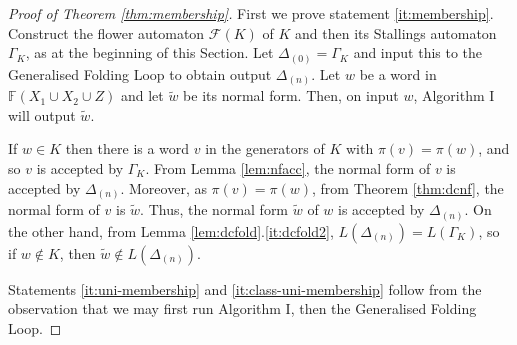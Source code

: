 \documentclass[a4paper,12pt]{article}
\newcommand{\G}{\Gamma }
\newcommand{\D}{\Delta }
\renewcommand{\L}{\Lambda }
\renewcommand{\S}{\Sigma }
\newcommand{\cA}{{\cal{A}}}
\newcommand{\cF}{{\cal{F}}}
\newtheorem{theorem}{Theorem}[section]
\numberwithin{equation}{section}
\numberwithin{figure}{section}
\newcommand{\FF}{\ensuremath{\mathbb{F}}}
\renewcommand{\cF}{\mathcal{F}}
\begin{document}

\begin{proof}[Proof of Theorem \ref{thm:membership}]
First we prove statement \ref{it:membership}.
Construct the flower automaton $\cF(K)$ of $K$ and then
its Stallings automaton $\G_K$,  as at the beginning of this Section. %
Let $\D_{(0)}=\G_K$ and input this to the Generalised Folding Loop to obtain output $\D_{(n)}$. 
Let  $w$ be a  word in $\FF(X_1\cup X_2\cup Z)$ and let $\tilde w$ be
its normal form. Then, on input $w$, Algorithm I will output $\tilde w$. 

If $w\in K$ then there is a word $v$ in the generators
 of $K$ with $\pi(v)=\pi(w)$, %
and so $v$ is accepted by $\G_K$.  From Lemma \ref{lem:nfacc}, the
normal form of $v$ is accepted by $\D_{(n)}$. Moreover, as 
$\pi(v)=\pi(w)$, 
from Theorem \ref{thm:dcnf}, the normal form of $v$ is $\tilde w$. 
Thus, 
the normal form  $\tilde w$ of $w$ is accepted by $\D_{(n)}$. 
On the other hand, from
Lemma \ref{lem:dcfold}.\ref{it:dcfold2}, $L(\D_{(n)})=L(\G_K)$,
so if $w\notin K$, then
$\tilde w\notin L(\D_{(n)})$.

Statements \ref{it:uni-membership} and \ref{it:class-uni-membership} follow
from the observation that we may
first run Algorithm I, then the Generalised Folding Loop.
\end{proof}
\end{document}
